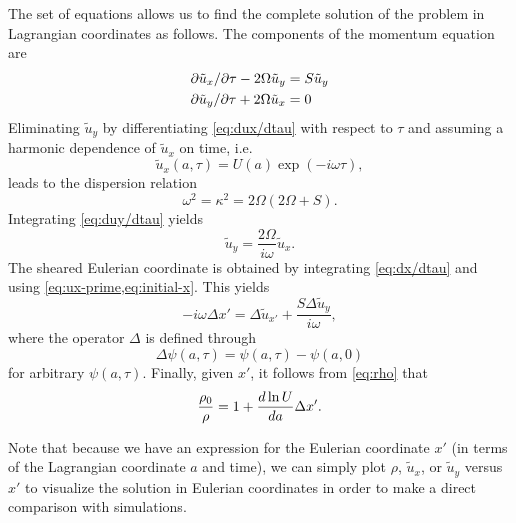\documentclass[aps,pre,notitlepage,amsmath,amssymb,amsfonts,nobibnotes,nofootinbib,superscriptaddress,onecolumn,a4paper,10pt]{revtex4-1}
\begin{document}
The set of equations
allows us to find the complete solution of the problem in Lagrangian
coordinates as follows. The components of the momentum equation
 are
\begin{align}
  \label{eq:dux/dtau}
  \partial{\tilde{u}_x}/\partial{\tau} - 2\Omega\tilde{u}_y &= S\tilde{u}_y \\
  \label{eq:duy/dtau}
  \partial{\tilde{u}_y}/\partial{\tau} + 2\Omega\tilde{u}_x &= 0
\end{align}
Eliminating $\tilde{u}_y$ by differentiating \cref{eq:dux/dtau} with respect
to $\tau$ and assuming a harmonic dependence of $\tilde{u}_x$ on time, i.e.
\begin{equation}
  \tilde{u}_x(a,\tau) = U(a)\exp(-i\omega\tau),
\end{equation}
leads to the dispersion relation
\begin{equation}
  \omega^2 = \kappa^2 = 2\Omega(2\Omega + S).
\end{equation}
Integrating \cref{eq:duy/dtau} yields
\begin{equation}
  \tilde{u}_y = \frac{2\Omega}{i\omega}\tilde{u}_x.
\end{equation}
The sheared Eulerian coordinate is obtained by integrating \cref{eq:dx/dtau}
and using \cref{eq:ux-prime,eq:initial-x}. This yields
\begin{equation}
  -i\omega\Delta x' = \Delta\tilde{u}_{x'}
  + \frac{S\Delta\tilde{u}_y}{i\omega},
\end{equation}
where the operator $\Delta$ is defined through
\begin{equation}
  \Delta\psi(a,\tau) = \psi(a,\tau) - \psi(a,0)
\end{equation}
for arbitrary $\psi(a,\tau)$.
Finally, given $x'$, it follows from \cref{eq:rho} that
\begin{equation}
  \frac{\rho_0}{\rho} = 1 + \frac{d\ln U}{da}\Delta x'.
\end{equation}

Note that because we have an expression for the Eulerian coordinate $x'$ (in
terms of the Lagrangian coordinate $a$ and time), we can simply plot $\rho$,
$\tilde{u}_x$, or $\tilde{u}_y$ versus $x'$ to visualize the solution in
Eulerian coordinates in order to make a direct comparison with simulations.


\end{document}
